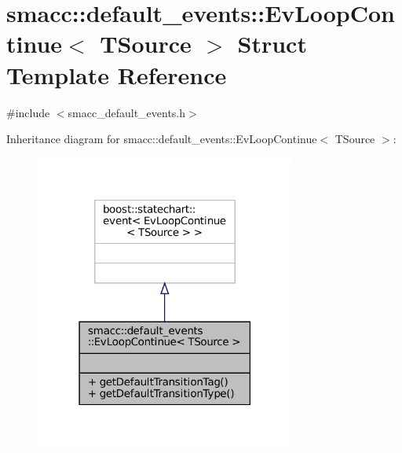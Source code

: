 \hypertarget{structsmacc_1_1default__events_1_1EvLoopContinue}{}\section{smacc\+:\+:default\+\_\+events\+:\+:Ev\+Loop\+Continue$<$ T\+Source $>$ Struct Template Reference}
\label{structsmacc_1_1default__events_1_1EvLoopContinue}


{\ttfamily \#include $<$smacc\+\_\+default\+\_\+events.\+h$>$}



Inheritance diagram for smacc\+:\+:default\+\_\+events\+:\+:Ev\+Loop\+Continue$<$ T\+Source $>$\+:
\nopagebreak
\begin{figure}[H]
\begin{center}
\leavevmode
\includegraphics[width=243pt]{structsmacc_1_1default__events_1_1EvLoopContinue__inherit__graph}
\end{center}
\end{figure}


